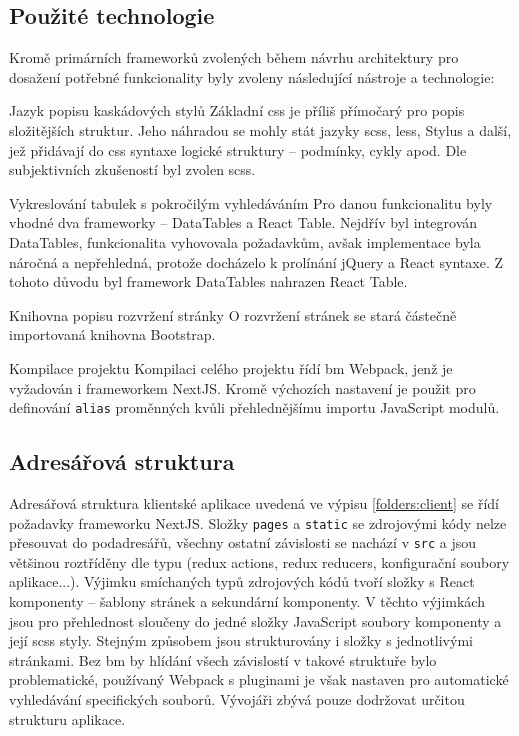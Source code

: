 \subsection{Použité technologie}

Kromě primárních frameworků zvolených během návrhu architektury pro dosažení potřebné funkcionality byly zvoleny následující nástroje a technologie:

\begin{dl}
   \item [Jazyk popisu kaskádových stylů] Základní \gls{css} je příliš přímočarý pro popis složitějších struktur. Jeho náhradou se mohly stát jazyky \gls{scss}, \gls{less}, Stylus a další, jež přidávají do \gls{css} syntaxe logické struktury -- podmínky, cykly apod. Dle subjektivních zkušeností byl zvolen \gls{scss}.
   
   \item [Vykreslování tabulek s pokročilým vyhledáváním] Pro danou funkcionalitu byly vhodné dva frameworky -- DataTables a React Table. Nejdřív byl integrován DataTables, funkcionalita vyhovovala požadavkům, avšak implementace byla náročná a nepřehledná, protože docházelo k prolínání jQuery a React syntaxe. Z tohoto důvodu byl framework DataTables nahrazen React Table.
   
   \item [Knihovna popisu rozvržení stránky] O rozvržení stránek se stará částečně importovaná knihovna Bootstrap.
   
   \item [Kompilace projektu] Kompilaci celého projektu řídí \gls{bm} Webpack, jenž je vyžadován i frameworkem NextJS. Kromě výchozích nastavení je použit pro definování \texttt{alias} proměnných kvůli přehlednějšímu importu JavaScript modulů.
\end{dl}



\subsection{Adresářová struktura}

Adresářová struktura klientské aplikace uvedená ve výpisu \ref{folders:client} se řídí požadavky frameworku \mbox{NextJS}. Složky \texttt{pages} a \texttt{static} se zdrojovými kódy nelze přesouvat do podadresářů, všechny ostatní závislosti se nachází v \texttt{src} a jsou většinou roztříděny dle typu (redux actions, redux reducers, konfigurační soubory aplikace...). Výjimku smíchaných typů zdrojových kódů tvoří složky s React komponenty -- šablony stránek a sekundární komponenty. V těchto výjimkách jsou pro přehlednost sloučeny do jedné složky JavaScript soubory komponenty a její \gls{scss} styly. Stejným způsobem jsou strukturovány i složky s jednotlivými stránkami. Bez \gls{bm} by hlídání všech závislostí v takové struktuře bylo problematické, používaný Webpack s pluginami je však nastaven pro automatické vyhledávání specifických souborů. Vývojáři zbývá pouze dodržovat určitou strukturu aplikace.

